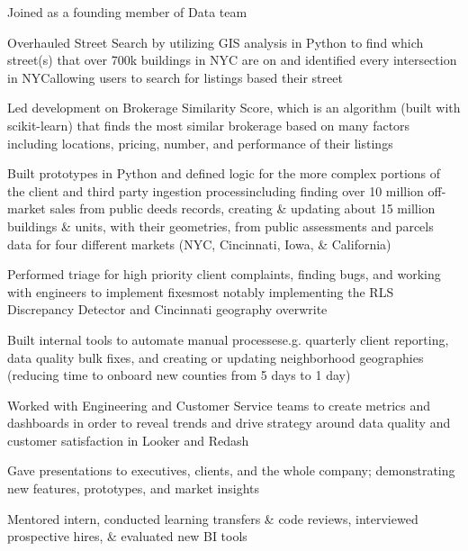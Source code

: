 \documentclass[a4paper]{deedy-resume-openfont} %
\begin{document}
\begin{minipage}[t]{0.66\textwidth}
\begin{tightitemize}
	\item Joined as a founding member of Data team
    \item Overhauled Street Search by utilizing GIS analysis in Python to find which street(s) that over 700k buildings in NYC are on and identified every intersection in NYC\textemdash allowing users to search for listings based their street
    \item Led development on Brokerage Similarity Score, which is an algorithm (built with scikit-learn) that finds the most similar brokerage based on many factors including locations, pricing, number, and performance of their listings
    \item Built prototypes in Python and defined logic for the more complex portions of the client and third party ingestion process\textemdash including finding over 10 million off-market sales from public deeds records, creating \& updating about 15 million buildings \& units, with their geometries, from public assessments and parcels data for four different markets (NYC, Cincinnati, Iowa, \& California)
    \item Performed triage for high priority client complaints, finding bugs, and working with engineers to implement fixes\textemdash most notably implementing the RLS Discrepancy Detector and Cincinnati geography overwrite
    \item Built internal tools to automate manual processes\textemdash e.g. quarterly client reporting, data quality bulk fixes, and creating or updating neighborhood geographies (reducing time to onboard new counties from 5 days to 1 day)
    \item Worked with Engineering and Customer Service teams to create metrics and dashboards in order to reveal trends and drive strategy around data quality and customer satisfaction in Looker and Redash
    \item Gave presentations to executives, clients, and the whole company; demonstrating new features, prototypes, and market insights
    \item Mentored intern, conducted learning transfers \& code reviews, interviewed prospective hires, \& evaluated new BI tools
\end{tightitemize}


\end{minipage}
\end{document}
